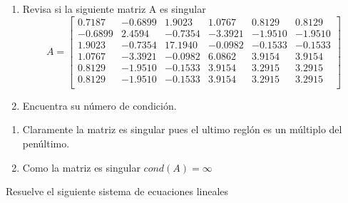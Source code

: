 \documentclass[paper=letter, fontsize=11pt]{scrartcl}
\numberwithin{equation}{section} %
\numberwithin{figure}{section} %
\numberwithin{table}{section} %
\newenvironment{cframed}[1][blue]
  {\begin{tcolorbox}[colframe=#1,colback=white]}
  {\end{tcolorbox}}
\begin{document}
\begin{enumerate}
\begin{cframed}[violet]
\item 
\begin{enumerate}
\item Revisa si la siguiente matriz A es singular 
\[ A = 
\begin{bmatrix}
0.7187 & -0.6899& 1.9023& 1.0767& 0.8129& 0.8129\\
-0.6899& 2.4594& -0.7354& -3.3921& -1.9510& -1.9510\\
1.9023& -0.7354& 17.1940& -0.0982& -0.1533& -0.1533\\
1.0767& -3.3921& -0.0982& 6.0862& 3.9154& 3.9154\\
0.8129& -1.9510& -0.1533& 3.9154& 3.2915& 3.2915\\
0.8129& -1.9510& -0.1533& 3.9154& 3.2915& 3.2915\\
\end{bmatrix}
\]
\item Encuentra su número de condición.
\end{enumerate}
\end{cframed}

\begin{enumerate}
\item  Claramente la matriz es singular pues el ultimo reglón es un múltiplo del penúltimo.
\item Como la matriz es singular $cond(A)=\infty$
\end{enumerate}



\begin{cframed}[teal]
\item Resuelve el siguiente sistema de ecuaciones lineales


\end{cframed}
\end{enumerate}
\end{document}
